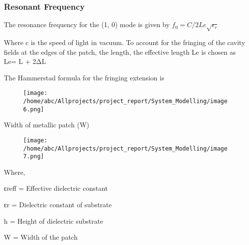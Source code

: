 \documentclass[12pt]{article}
\begin{document}
              \subsubsection{Resonant Frequency}\label{sub:Resonant Frequency}
               \justify
	              The resonance frequency for the (1, 0) mode is given by
			          \newline    \newline
			          \centering
			              $ f_0 = C/2Le\sqrt{\epsilon_r } $

	               Where c is the speed of light in vacuum. To account for the fringing of the cavity fields at the edges of the patch, the length, the effective length Le is chosen as
	               \newline
						               \centering
	                                        Le= L + 2ΔL

	               The Hammerstad formula for the fringing extension is

	                 \begin{figure}[H]
	                 	\centering
	                 	\texttt{[image: /home/abc/Allprojects/project\_report/System\_Modelling/image6.png]}

	                 \end{figure}

	                      Width of metallic patch (W)
				        \begin{figure}[H]
				        	\centering
				        	\texttt{[image: /home/abc/Allprojects/project\_report/System\_Modelling/image7.png]}

				        \end{figure}

                  Where,
                  \item
                    εreff = Effective dielectric constant
                    \item
                    εr = Dielectric constant of substrate
                  \item
                    h = Height of dielectric substrate
                     \item
                    W = Width of the patch

	         \cleardoublepage
\end{document}
